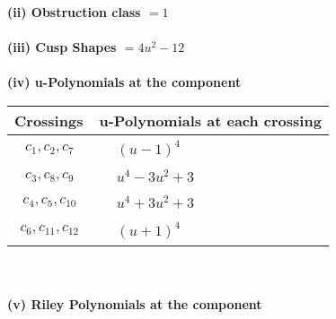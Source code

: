 \documentclass[1p]{elsarticle_modified}
\theoremstyle{definition}
\begin{document}
\flushleft \textbf{(ii) Obstruction class $= 1$}\\~\\
\flushleft \textbf{(iii) Cusp Shapes $= 4 u^2-12$}\\~\\
\newpage\renewcommand{\arraystretch}{1}
\flushleft \textbf{(iv) u-Polynomials at the component}\newline \\
\begin{tabular}{m{50pt}|m{274pt}}
Crossings & \hspace{64pt}u-Polynomials at each crossing \\
\hline $$\begin{aligned}c_{1},c_{2},c_{7}\end{aligned}$$&$\begin{aligned}
&(u-1)^4
\end{aligned}$\\
\hline $$\begin{aligned}c_{3},c_{8},c_{9}\end{aligned}$$&$\begin{aligned}
&u^4-3 u^2+3
\end{aligned}$\\
\hline $$\begin{aligned}c_{4},c_{5},c_{10}\end{aligned}$$&$\begin{aligned}
&u^4+3 u^2+3
\end{aligned}$\\
\hline $$\begin{aligned}c_{6},c_{11},c_{12}\end{aligned}$$&$\begin{aligned}
&(u+1)^4
\end{aligned}$\\
\hline
\end{tabular}\\~\\
\newpage\renewcommand{\arraystretch}{1}
\flushleft \textbf{(v) Riley Polynomials at the component}\newline \\
\end{document}
